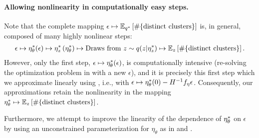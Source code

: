 \paragraph{Allowing nonlinearity in computationally easy steps.}
%
Note that the complete mapping
$\epsilon \mapsto \mathbb{E}_{q^{*}} \left[ \#\{\text{distinct clusters}\} \right]$
is, in general, composed of many highly nonlinear steps:
%
\begin{align*}
\epsilon \mapsto
\eta_\theta^{*}(\epsilon) \mapsto
\eta_z^{*}\left(\eta_\theta^{*}\right) \mapsto
\textrm{Draws from }z \sim q(z \vert \eta_z^{*}) \mapsto
\mathbb{E}_z \left[ \#\{\text{distinct clusters}\} \right].
\end{align*}
%
However, only the first step, $\epsilon \mapsto \eta_\theta^{*}(\epsilon)$, is
computationally intensive (re-solving the optimization problem in
 with a new $\epsilon$), and it is precisely
this first step which we approximate linearly using
, i.e., with $\epsilon \mapsto \eta_\theta^{*}(0) -
H^{-1} f_\eta \epsilon$. Consequently, our approximations retain the
nonlinearity in the mapping $\eta_\theta^{*} \mapsto \mathbb{E}_z \left[
\#\{\text{distinct clusters}\} \right]$.

Furthermore, we attempt to improve the linearity of the dependence of
$\eta_\theta^{*}$ on $\epsilon$ by using an unconstrained parameterization for
$\eta_\theta$ as in \citet{stan-manual:2015} and \citet{kucukelbir:2015:advi}.
